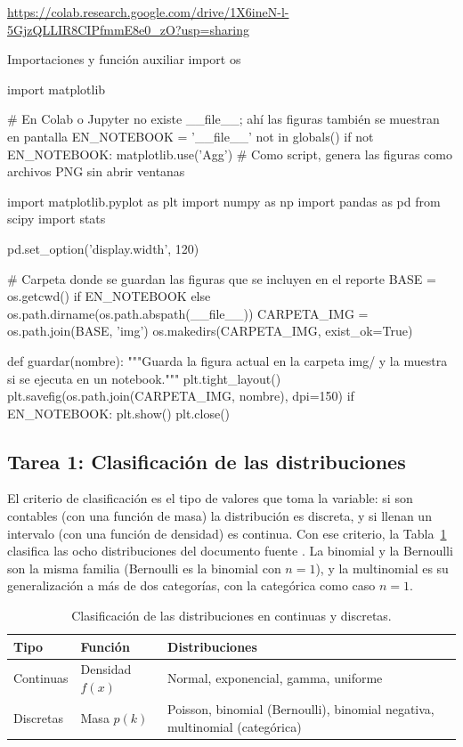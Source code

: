 \documentclass[11pt,letterpaper]{article}
\begin{document}
\begin{center}
    \url{https://colab.research.google.com/drive/1X6ineN-l-5GjzQLLIR8CIPfmmE8e0_zO?usp=sharing}
\end{center}

\begin{codigo}[label=cod:comun]{Importaciones y función auxiliar}
import os

import matplotlib

# En Colab o Jupyter no existe __file__; ahí las figuras también se muestran en pantalla
EN_NOTEBOOK = '__file__' not in globals()
if not EN_NOTEBOOK:
    matplotlib.use('Agg')  # Como script, genera las figuras como archivos PNG sin abrir ventanas

import matplotlib.pyplot as plt
import numpy as np
import pandas as pd
from scipy import stats

pd.set_option('display.width', 120)

# Carpeta donde se guardan las figuras que se incluyen en el reporte
BASE = os.getcwd() if EN_NOTEBOOK else os.path.dirname(os.path.abspath(__file__))
CARPETA_IMG = os.path.join(BASE, 'img')
os.makedirs(CARPETA_IMG, exist_ok=True)


def guardar(nombre):
    """Guarda la figura actual en la carpeta img/ y la muestra si se ejecuta en un notebook."""
    plt.tight_layout()
    plt.savefig(os.path.join(CARPETA_IMG, nombre), dpi=150)
    if EN_NOTEBOOK:
        plt.show()
    plt.close()
\end{codigo}

\subsection{Tarea 1: Clasificación de las distribuciones}

El criterio de clasificación es el tipo de valores que toma la variable: si son contables (con una función de masa) la distribución es discreta, y si llenan un intervalo (con una función de densidad) es continua. Con ese criterio, la Tabla~\ref{tab:clasificacion} clasifica las ocho distribuciones del documento fuente \parencite{tecnm2026_documento_fuente}. La binomial y la Bernoulli son la misma familia (Bernoulli es la binomial con $n = 1$), y la multinomial es su generalización a más de dos categorías, con la categórica como caso $n = 1$.

\begin{table}[htbp]
\centering
\caption{Clasificación de las distribuciones en continuas y discretas.}
\label{tab:clasificacion}
\small
\renewcommand{\arraystretch}{1.4}
\begin{tabular}{lll}
\hline
\textbf{Tipo} & \textbf{Función} & \textbf{Distribuciones} \\
\hline
Continuas & Densidad $f(x)$ & Normal, exponencial, gamma, uniforme \\
Discretas & Masa $p(k)$ & Poisson, binomial (Bernoulli), binomial negativa, multinomial (categórica) \\
\hline
\end{tabular}
\end{table}
\end{document}
